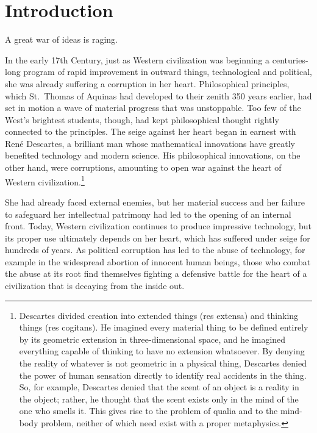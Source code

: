 \documentclass[twocolumn]{article}
\begin{document}
\thispagestyle{fancy}

\section{Introduction}

A great war of ideas is raging.

In the early 17th Century, just as Western civilization was beginning a
centuries-long program of rapid improvement in outward things, technological
and political, she was already suffering a corruption in her heart.
Philosophical principles, which St.~Thomas of Aquinas had developed to their
zenith 350 years earlier, had set in motion a wave of material progress that
was unstoppable.  Too few of the West's brightest students, though, had kept
philosophical thought rightly connected to the principles.  The seige against
her heart began in earnest with Ren\'e Descartes, a brilliant man whose
mathematical innovations have greatly benefited technology and modern science.
His philosophical innovations, on the other hand, were corruptions, amounting
to open war against the heart of Western civilization.\footnote{%
   Descartes divided creation into extended things (res extensa) and thinking
   things (res cogitans). He imagined every material thing to be defined
   entirely by its geometric extension in three-dimensional space, and he
   imagined everything capable of thinking to have no extension whatsoever.  By
   denying the reality of whatever is not geometric in a physical thing,
   Descartes denied the power of human sensation directly to identify real
   accidents in the thing.  So, for example, Descartes denied that the scent of
   an object is a reality in the object; rather, he thought that the scent
   exists only in the mind of the one who smells it.  This gives rise to the
   problem of qualia and to the mind-body problem, neither of which need exist
   with a proper metaphysics.
}

She had already faced external enemies, but her material success and her
failure to safeguard her intellectual patrimony had led to the opening of an
internal front.  Today, Western civilization continues to produce impressive
technology, but its proper use ultimately depends on her heart, which has
suffered under seige for hundreds of years. As political corruption has led to
the abuse of technology, for example in the widespread abortion of innocent
human beings, those who combat the abuse at its root find themselves fighting a
defensive battle for the heart of a civilization that is decaying from the
inside out.
\end{document}
